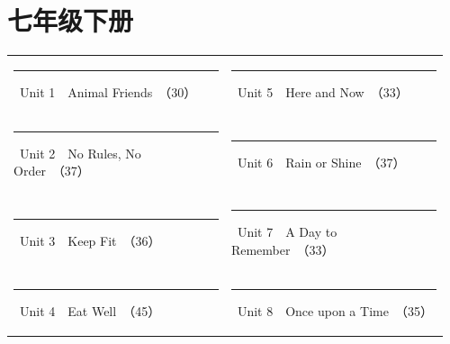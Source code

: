 \documentclass[UTF8,a4paper,11pt,oneside]{ctexbook}
\begin{document}
\chapter{七年级下册}
\par\noindent{\color{volcolor}\rule{\linewidth}{2.6pt}}\par
\vspace{0.3em}
\par
\vspace{1.0em}
\par
\vspace{0.35em}
\noindent\begin{tabular}{@{}p{0.48\linewidth}p{0.48\linewidth}@{}}
{\color{volcolor}\rule[0.3ex]{0.85ex}{0.85ex}}~Unit 1　Animal Friends~{\footnotesize\color{textgray!80}（30）} & {\color{volcolor}\rule[0.3ex]{0.85ex}{0.85ex}}~Unit 5　Here and Now~{\footnotesize\color{textgray!80}（33）} \\
{\color{volcolor}\rule[0.3ex]{0.85ex}{0.85ex}}~Unit 2　No Rules, No Order~{\footnotesize\color{textgray!80}（37）} & {\color{volcolor}\rule[0.3ex]{0.85ex}{0.85ex}}~Unit 6　Rain or Shine~{\footnotesize\color{textgray!80}（37）} \\
{\color{volcolor}\rule[0.3ex]{0.85ex}{0.85ex}}~Unit 3　Keep Fit~{\footnotesize\color{textgray!80}（36）} & {\color{volcolor}\rule[0.3ex]{0.85ex}{0.85ex}}~Unit 7　A Day to Remember~{\footnotesize\color{textgray!80}（33）} \\
{\color{volcolor}\rule[0.3ex]{0.85ex}{0.85ex}}~Unit 4　Eat Well~{\footnotesize\color{textgray!80}（45）} & {\color{volcolor}\rule[0.3ex]{0.85ex}{0.85ex}}~Unit 8　Once upon a Time~{\footnotesize\color{textgray!80}（35）} \\
\end{tabular}
\vspace{1.3em}
\end{document}
